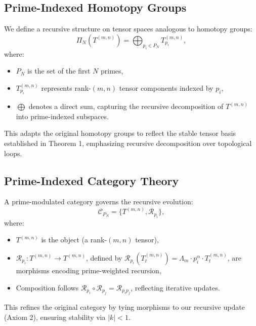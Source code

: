 \documentclass{article}
\theoremstyle{plain}
\begin{document}
\subsection{Prime-Indexed Homotopy Groups}
We define a recursive structure on tensor spaces analogous to homotopy groups:
\begin{equation}
    \Pi_N(T^{(m,n)}) = \bigoplus_{p_i \in P_N} T_{p_i}^{(m,n)},
\end{equation}
where:
\begin{itemize}
    \item \( P_N \) is the set of the first \( N \) primes,
    \item \( T_{p_i}^{(m,n)} \) represents rank-$(m,n)$ tensor components indexed by \( p_i \),
    \item \( \bigoplus \) denotes a direct sum, capturing the recursive decomposition of \( T^{(m,n)} \) into prime-indexed subspaces.
\end{itemize}
This adapts the original homotopy groups to reflect the stable tensor basis established in Theorem 1, emphasizing recursive decomposition over topological loops.

\subsection{Prime-Indexed Category Theory}
A prime-modulated category governs the recursive evolution:
\begin{equation}
    \mathcal{C}_{P_N} = \{ T^{(m,n)}, \mathcal{R}_{p_i} \},
\end{equation}
where:
\begin{itemize}
    \item \( T^{(m,n)} \) is the object (a rank-$(m,n)$ tensor),
    \item \( \mathcal{R}_{p_i}: T^{(m,n)} \to T^{(m,n)} \), defined by \( \mathcal{R}_{p_i}(T_t^{(m,n)}) = \Lambda_m \cdot p_i^\alpha \cdot T_t^{(m,n)} \), are morphisms encoding prime-weighted recursion,
    \item Composition follows \( \mathcal{R}_{p_i} \circ \mathcal{R}_{p_j} = \mathcal{R}_{p_i p_j} \), reflecting iterative updates.
\end{itemize}
This refines the original category by tying morphisms to our recursive update (Axiom 2), ensuring stability via \( |k| < 1 \).
\end{document}
